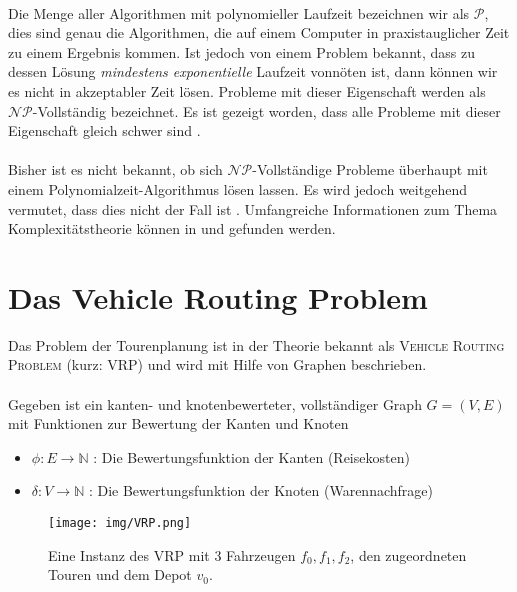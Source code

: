 \\
Die Menge aller Algorithmen mit polynomieller Laufzeit bezeichnen wir als $\mathcal{P}$, dies sind genau die Algorithmen, die auf einem Computer in praxistauglicher Zeit zu einem Ergebnis kommen. Ist jedoch von einem Problem bekannt, dass zu dessen Lösung \emph{mindestens exponentielle} Laufzeit vonnöten ist, dann können wir es nicht in akzeptabler Zeit lösen. Probleme mit dieser Eigenschaft werden als $\mathcal{NP}$-Vollständig bezeichnet. Es ist gezeigt worden, dass alle Probleme mit dieser Eigenschaft gleich schwer sind \cite{Karp}. \\
\\
Bisher ist es nicht bekannt, ob sich $\mathcal{NP}$-Vollständige Probleme überhaupt mit einem Polynomialzeit-Algorithmus lösen lassen. Es wird jedoch weitgehend vermutet, dass dies nicht der Fall ist \cite{Cook}. Umfangreiche Informationen zum Thema Komplexitätstheorie können in \cite{GJ} und \cite{Sipser} gefunden werden.


\section{Das Vehicle Routing Problem}\label{chp:vrp}
Das Problem der Tourenplanung ist in der Theorie bekannt als \textsc{Vehicle Routing Problem} (kurz: \textsc{VRP}) und wird mit Hilfe von Graphen beschrieben. \\
\\
Gegeben ist ein kanten- und knotenbewerteter, vollständiger Graph $G = \left( V, E \right)$ mit Funktionen zur Bewertung der Kanten und Knoten
\begin{itemize}
  \item $\phi \colon E \rightarrow \mathbb{N}$ : Die Bewertungsfunktion der Kanten (Reisekosten)
  \item $\delta \colon V \rightarrow \mathbb{N}$ : Die Bewertungsfunktion der Knoten (Warennachfrage)
\end{itemize}
\vspace*{1em}

\begin{wrapfigure}{r}{0.48\textwidth}
  \vspace{-15pt}
  \begin{center}
    \texttt{[image: img/VRP.png]}
  \end{center}
  \vspace{-5pt}
  \caption[Beispiel: \textsc{VRP}]{Eine Instanz des \textsc{VRP} mit 3 Fahrzeugen $f_0, f_1, f_2$, den zugeordneten Touren und dem Depot $v_0$.}
  \label{fig:vrp}
\end{wrapfigure}

